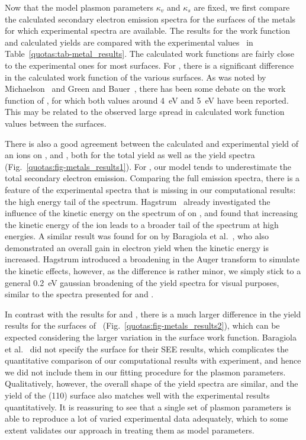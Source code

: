 \begin{refsection}
Now that the model plasmon parameters $\kappa_v$ and $\kappa_s$ are fixed, 
we first compare the calculated secondary electron emission spectra for the surfaces of 
the metals for which experimental spectra are available. The results for 
the work function and calculated yields are compared with the experimental 
values~\cite{DeWaele2016, Baragiola2001, Hagstrum1966} in 
Table~\ref{quotas:tab-metal_results}. The calculated work functions are fairly 
close to the experimental ones for most surfaces. For , there is a 
significant difference in the calculated work function of the various 
surfaces. As was noted by Michaelson~\cite{Michaelson1977} and Green and 
Bauer~\cite{Green1978}, there has been some debate on the work function of 
, for which both values around 4~\si{\electronvolt} and 5~\si{\electronvolt} have been 
reported. This may be related to the observed large spread in calculated work 
function values between the surfaces. 

There is also a good agreement between the calculated and experimental yield 
of  an  ions on ,  and , both for 
the total yield as well as the yield spectra 
(Fig.~\ref{quotas:fig-metals_results1}). For , our model tends to 
underestimate the total secondary electron emission. Comparing the full 
emission spectra, there is a feature of the experimental spectra that is 
missing in our computational results: the high energy tail of the spectrum. 
Hagstrum~\cite{Hagstrum1960} already investigated the influence of the kinetic 
energy on the spectrum of  on , and found that increasing 
the kinetic energy of the ion leads to a broader tail of the spectrum at high 
energies. A similar result was found for  on  by Baragiola et 
al.~\cite{Baragiola1996}, who also demonstrated an overall gain in electron 
yield when the kinetic energy is increased. Hagstrum introduced a broadening 
in the Auger transform to simulate the kinetic effects, however, as the 
difference is rather minor, we simply stick to a general 
0.2~\si{\electronvolt} gaussian broadening of the yield spectra for visual 
purposes, similar to the spectra presented for  and .

In contrast with the results for  and , there is a much larger 
difference in the yield results for the surfaces of 
~(Fig.~\ref{quotas:fig-metals_results2}), which can be expected 
considering the larger variation in the surface work function. Baragiola et 
al.~\cite{Baragiola2001} did not specify the  surface for their SEE results, which 
complicates the quantitative comparison of our computational results with 
experiment, and hence we did not include them in our fitting procedure for the 
plasmon parameters. Qualitatively, however, the overall shape of the  
yield spectra are similar, and the yield of the (110) surface also matches 
well with the experimental results quantitatively. It is reassuring to see 
that a single set of plasmon parameters is able to reproduce a lot of varied 
experimental data adequately, which to some extent validates our approach in 
treating them as model parameters. 


\end{refsection}
